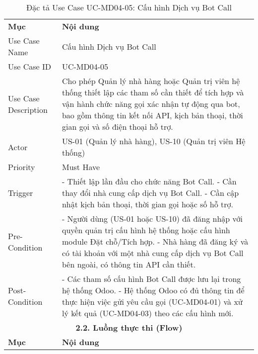 \begin{longtable}{|m{4cm}|p{11cm}|}
\caption{Đặc tả Use Case UC-MD04-05: Cấu hình Dịch vụ Bot Call} \label{tab:uc_md04_05} \\
\hline

\endhead %
\hline
\endfoot %
\hline
\endlastfoot %
\multicolumn{2}{|c|}{\textbf{2.1. Tóm tắt (Summary)}} \\
\hline
\textbf{Mục} & \textbf{Nội dung} \\
\hline
Use Case Name & Cấu hình Dịch vụ Bot Call \\
\hline
Use Case ID & UC-MD04-05 \\
\hline
Use Case Description & Cho phép Quản lý nhà hàng hoặc Quản trị viên hệ thống thiết lập các tham số cần thiết để tích hợp và vận hành chức năng gọi xác nhận tự động qua bot, bao gồm thông tin kết nối API, kịch bản thoại, thời gian gọi và số điện thoại hỗ trợ. \\
\hline
Actor & US-01 (Quản lý nhà hàng), US-10 (Quản trị viên Hệ thống) \\
\hline
Priority & Must Have \\
\hline
Trigger & - Thiết lập lần đầu cho chức năng Bot Call. \newline - Cần thay đổi nhà cung cấp dịch vụ Bot Call. \newline - Cần cập nhật kịch bản thoại, thời gian gọi hoặc số hỗ trợ. \\
\hline
Pre-Condition & - Người dùng (US-01 hoặc US-10) đã đăng nhập với quyền quản trị cấu hình hệ thống hoặc cấu hình module Đặt chỗ/Tích hợp. \newline - Nhà hàng đã đăng ký và có tài khoản với một nhà cung cấp dịch vụ Bot Call bên ngoài, có thông tin API cần thiết. \\
\hline
Post-Condition & - Các tham số cấu hình Bot Call được lưu lại trong hệ thống Odoo. \newline - Hệ thống Odoo có đủ thông tin để thực hiện việc gửi yêu cầu gọi (UC-MD04-01) và xử lý kết quả (UC-MD04-03) theo các cấu hình mới. \\
\hline
\multicolumn{2}{|c|}{\textbf{2.2. Luồng thực thi (Flow)}} \\
\hline
\textbf{Mục} & \textbf{Nội dung} \\
\hline

\end{longtable}
